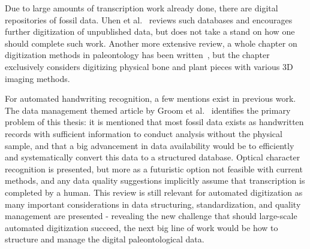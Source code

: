 \documentclass[english,twoside,openright]{UH_DS_MSc}
\begin{document}
Due to large amounts of transcription work already done, there are digital repositories of fossil data.
Uhen et al.~\cite{uhenCardCatalogsComputers2013} reviews such databases and encourages further 
digitization of unpublished data, but does not take a stand on how one should complete such work.
Another more extensive review, a whole chapter on digitization methods in paleontology has been written~\cite{mallisonDigitizingMethodsPaleontology2011},
but the chapter exclusively considers digitizing physical bone and plant pieces with various 3D imaging methods.

For automated handwriting recognition, a few mentions exist in previous work. The data management themed 
article by Groom et al.~\cite{groomImprovedStandardizationTranscribed2019} identifies the primary 
problem of this thesis: it is mentioned that most fossil data exists as handwritten records with sufficient information 
to conduct analysis without the physical sample, and that a big advancement in data availability would be to efficiently and 
systematically convert this data to a structured database. Optical character recognition is presented, but more as a futuristic option 
not feasible with current methods, and any data quality suggestions implicitly assume that transcription is completed 
by a human. This review is still relevant for automated digitization as many important considerations in data structuring,
standardization, and quality management are presented - revealing the new challenge that should large-scale automated digitization succeed,
the next big line of work would be how to structure and manage the digital paleontological data.
\end{document}
